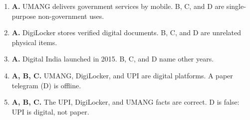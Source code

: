 \documentclass[11pt]{article}
\begin{document}
\begin{enumerate}[label=\textbf{Q\arabic*.}, leftmargin=*]
\item \textbf{A.} UMANG delivers government services by mobile. B, C, and D are single-purpose non-government uses.
\item \textbf{A.} DigiLocker stores verified digital documents. B, C, and D are unrelated physical items.
\item \textbf{A.} Digital India launched in 2015. B, C, and D name other years.
\item \textbf{A, B, C.} UMANG, DigiLocker, and UPI are digital platforms. A paper telegram (D) is offline.
\item \textbf{A, B, C.} The UPI, DigiLocker, and UMANG facts are correct. D is false: UPI is digital, not paper.
\end{enumerate}
\def\JKSSBLessonID{57}\def\JKSSBAnswers{1}
\end{document}
